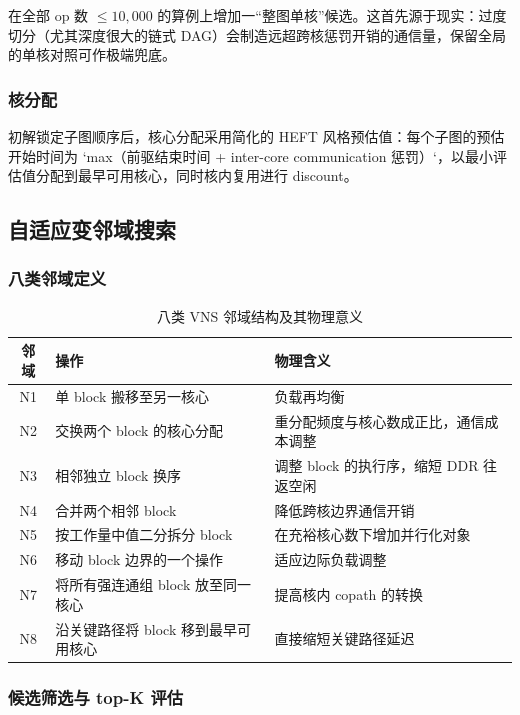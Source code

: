 \documentclass[bwprint]{gmcmthesis}
\begin{document}
在全部 op 数 $\leq 10,000$ 的算例上增加一“整图单核”候选。这首先源于现实：过度切分（尤其深度很大的链式 DAG）会制造远超跨核惩罚开销的通信量，保留全局的单核对照可作极端兜底。

\subsubsection{核分配}

初解锁定子图顺序后，核心分配采用简化的 HEFT 风格预估值：每个子图的预估开始时间为 `max（前驱结束时间 + inter-core communication 惩罚）`，以最小评估值分配到最早可用核心，同时核内复用进行 discount。

\subsection{自适应变邻域搜索}

\subsubsection{八类邻域定义}

\begin{table}[!h]
\centering
\caption{八类 VNS 邻域结构及其物理意义}
\label{tab:neighborhoods}
\small
\begin{tabular}{c ll}
\toprule
\textbf{邻域} & \textbf{操作} & \textbf{物理含义} \\
\midrule
N1 & 单 block 搬移至另一核心              & 负载再均衡 \\
N2 & 交换两个 block 的核心分配             & 重分配频度与核心数成正比，通信成本调整 \\
N3 & 相邻独立 block 换序                  & 调整 block 的执行序，缩短 DDR 往返空闲 \\
N4 & 合并两个相邻 block                   & 降低跨核边界通信开销 \\
N5 & 按工作量中值二分拆分 block            & 在充裕核心数下增加并行化对象 \\
N6 & 移动 block 边界的一个操作             & 适应边际负载调整 \\
N7 & 将所有强连通组 block 放至同一核心      & 提高核内 copath 的转换 \\
N8 & 沿关键路径将 block 移到最早可用核心   & 直接缩短关键路径延迟 \\
\bottomrule
\end{tabular}
\end{table}

\subsubsection{候选筛选与 top-K 评估}
\end{document}
